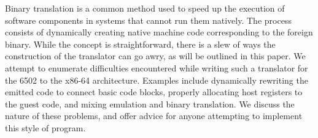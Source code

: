 Binary translation is a common method used to speed up the execution of
software components in systems that cannot run them natively.  The process
consists of dynamically creating native machine code corresponding to the
foreign binary.  While the concept is straightforward, there is a slew of ways
the construction of the translator can go awry, as will be outlined in this
paper.  We attempt to enumerate difficulties encountered while writing such a
translator for the 6502 to the x86-64 architecture.  Examples include
dynamically rewriting the emitted code to connect basic code blocks, properly
allocating host registers to the guest code, and mixing emulation and binary
translation.  We discuss the nature of these problems, and offer advice for
anyone attempting to implement this style of program.


